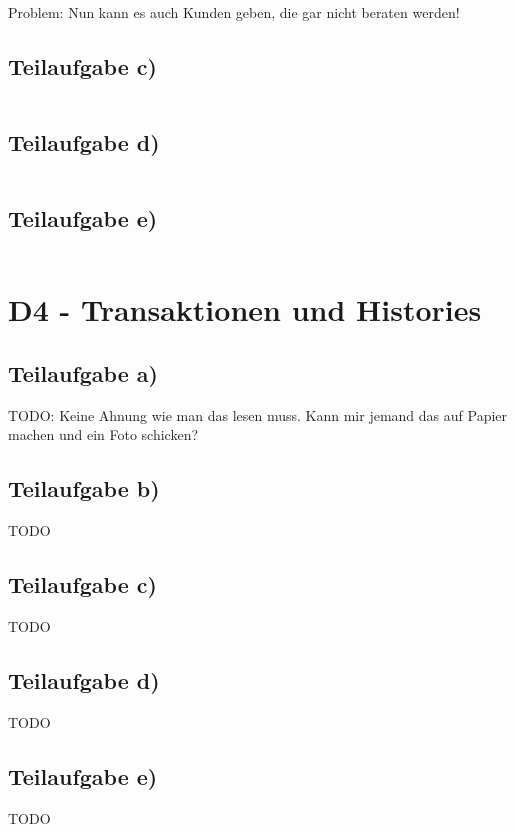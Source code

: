 \documentclass[a4paper,9pt]{scrartcl}
\begin{document}
Problem: Nun kann es auch Kunden geben, die gar nicht beraten werden!

\subsection{Teilaufgabe c)}
\inputminted[linenos, numbersep=5pt, tabsize=4]{sql}{d3c.sql}

\subsection{Teilaufgabe d)}
\inputminted[linenos, numbersep=5pt, tabsize=4]{sql}{d3d.sql}

\subsection{Teilaufgabe e)}
\inputminted[linenos, numbersep=5pt, tabsize=4]{sql}{d3e.sql}

\section{D4 - Transaktionen und Histories}
\subsection{Teilaufgabe a)}
TODO: Keine Ahnung wie man das lesen muss. Kann mir jemand das auf
Papier machen und ein Foto schicken?

\subsection{Teilaufgabe b)}
TODO

\subsection{Teilaufgabe c)}
TODO

\subsection{Teilaufgabe d)}
TODO

\subsection{Teilaufgabe e)}
TODO
\end{document}

